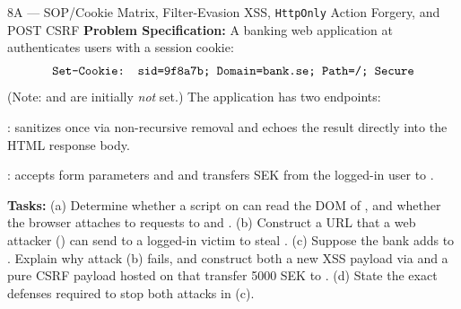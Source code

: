\begin{templatebox}{8A --- SOP/Cookie Matrix, Filter-Evasion XSS, \texttt{HttpOnly} Action Forgery, and POST CSRF}
\textbf{Problem Specification:} A banking web application at  authenticates users with a session cookie:
\[
  \texttt{Set-Cookie: sid=9f8a7b; Domain=bank.se; Path=/; Secure}
\]
(Note:  and  are initially \emph{not} set.) The application has two endpoints:
\begin{compactitem}
  \item {}: sanitizes  once via non-recursive removal  and echoes the result directly into the HTML response body.
  \item {}: accepts form parameters  and  and transfers  SEK from the logged-in user to .
\end{compactitem}
\textbf{Tasks:} (a) Determine whether a script on  can read the DOM of , and whether the browser attaches  to requests to  and . (b) Construct a URL that a web attacker () can send to a logged-in victim to steal . (c) Suppose the bank adds  to . Explain why attack (b) fails, and construct both a new XSS payload via  and a pure CSRF payload hosted on  that transfer 5000 SEK to . (d) State the exact defenses required to stop both attacks in (c).


\end{templatebox}
